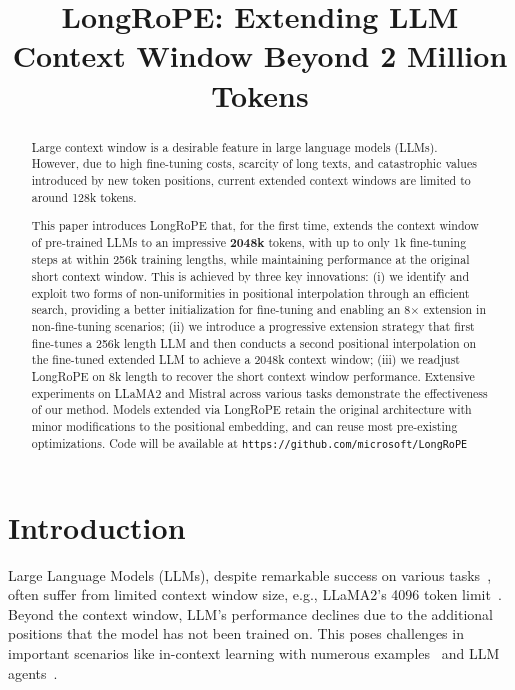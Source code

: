 \title{LongRoPE: Extending LLM Context Window Beyond 2 Million Tokens}

\begin{abstract}
Large context window is a desirable feature in large language models (LLMs). However, due to high fine-tuning costs, scarcity of long texts, and catastrophic values introduced by new token positions, current extended context windows are limited to around 128k tokens. 

This paper introduces LongRoPE that,  for the first time, extends the context window of pre-trained LLMs to an impressive  \textbf{2048k} tokens,  with up to only 1k fine-tuning steps at within 256k training lengths, while maintaining performance at the original short context window. This is achieved by three key innovations: (i) we identify and exploit two forms of non-uniformities in positional interpolation through an efficient  search, providing a better initialization for fine-tuning and  enabling an 8$\times$ extension in non-fine-tuning scenarios; (ii) we introduce a progressive extension strategy that first fine-tunes a 256k length LLM and then conducts a second  positional interpolation on the fine-tuned extended LLM to achieve a 2048k context window; (iii) we readjust LongRoPE on 8k length to recover the short context window performance. Extensive experiments on LLaMA2 and Mistral across various tasks demonstrate the effectiveness of our method.  Models extended via LongRoPE retain the original architecture with minor modifications to the positional embedding,  and can reuse most pre-existing optimizations. Code will be available at \texttt{https://github.com/microsoft/LongRoPE}
\end{abstract}

\section{Introduction}

Large Language Models (LLMs), despite remarkable success on various tasks~\cite{gpt4,llama2}, often suffer from limited context window size, e.g., LLaMA2's 4096 token limit~\cite{llama2}. Beyond the context window, LLM's performance declines due to the additional positions that the model has not been trained on. This poses challenges in important scenarios like in-context learning with numerous examples~\cite{Huang2023FewerIM} and LLM agents~\cite{park2023generative,madaan2023selfrefine}. 

